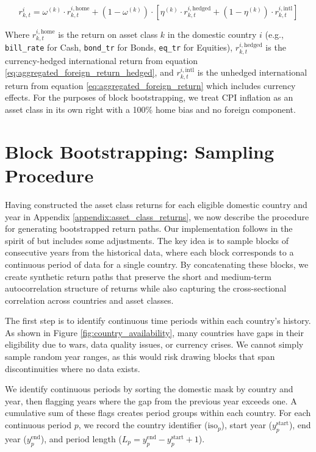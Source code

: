 \documentclass[11pt]{article}
\begin{document}
\begin{equation}\label{eq:final_asset_return}
  r^{i}_{k,t} = \omega^{(k)} \cdot r^{i,\text{home}}_{k,t} + (1 - \omega^{(k)}) \cdot \left[ \eta^{(k)} \cdot r^{i,\text{hedged}}_{k,t} + (1 - \eta^{(k)}) \cdot r^{i,\text{intl}}_{k,t} \right]  
\end{equation}

Where $r^{i,\text{home}}_{k,t}$ is the return on asset class $k$ in the domestic country $i$ (e.g., \texttt{bill\_rate} for Cash, \texttt{bond\_tr} for Bonds, \texttt{eq\_tr} for Equities), $r^{i,\text{hedged}}_{k,t}$ is the currency-hedged international return from equation \ref{eq:aggregated_foreign_return_hedged}, and $r^{i,\text{intl}}_{k,t}$ is the unhedged international return from equation \ref{eq:aggregated_foreign_return} which includes currency effects. For the purposes of block bootstrapping, we treat CPI inflation as an asset class in its own right with a 100\% home bias and no foreign component. 


\clearpage
\section{Block Bootstrapping: Sampling Procedure}
\label{appendix:block_bootstrap_sampling_procedure}

Having constructed the asset class returns for each eligible domestic country and year in Appendix \ref{appendix:asset_class_returns}, we now describe the procedure for generating bootstrapped return paths. Our implementation follows in the spirit of \textcite{anarkulova2025beyond} but includes some adjustments. The key idea is to sample blocks of consecutive years from the historical data, where each block corresponds to a continuous period of data for a single country. By concatenating these blocks, we create synthetic return paths that preserve the short and medium-term autocorrelation structure of returns while also capturing the cross-sectional correlation across countries and asset classes.

The first step is to identify continuous time periods within each country's history. As shown in Figure \ref{fig:country_availability}, many countries have gaps in their eligibility due to wars, data quality issues, or currency crises. We cannot simply sample random year ranges, as this would risk drawing blocks that span discontinuities where no data exists.

We identify continuous periods by sorting the domestic mask by country and year, then flagging years where the gap from the previous year exceeds one. A cumulative sum of these flags creates period groups within each country. For each continuous period $p$, we record the country identifier ($\text{iso}_p$), start year ($y_p^{\text{start}}$), end year ($y_p^{\text{end}}$), and period length ($L_p = y_p^{\text{end}} - y_p^{\text{start}} + 1$).
\end{document}
